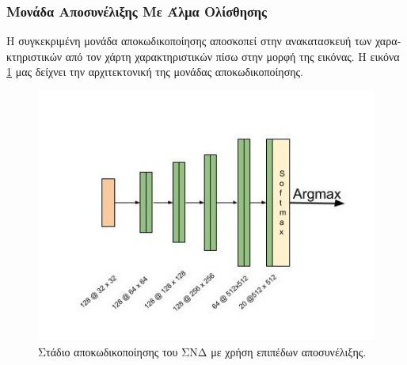 \subsubsection{\textgreek{Μονάδα Αποσυνέλιξης Με Άλμα Ολίσθησης}}
\label{sec:sd-decoder}
\textgreek{Η συγκεκριμένη μονάδα αποκωδικοποίησης αποσκοπεί στην ανακατασκευή των χαρακτηριστικών από τον χάρτη χαρακτηριστικών πίσω στην μορφή της εικόνας. Η εικόνα }\ref{fig:deconv_1_stage} \textgreek{μας δείχνει την αρχιτεκτονική της μονάδας αποκωδικοποίησης. }

\begin{figure}[H]
 \centering
 \includegraphics[scale=0.6]{Images/deconv_decoding}
  \caption[\textgreek{Στάδιο Αποκωδικοποίησης με βηματισμό}]{\textgreek{Στάδιο αποκωδικοποίησης του ΣΝΔ με χρήση επιπέδων αποσυνέλιξης.} }
 \label{fig:deconv_1_stage}
\end{figure}

